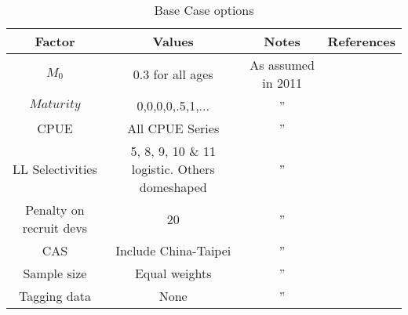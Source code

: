 \documentclass[a4paper,10pt]{article}
\begin{document}
\begin{table}
\begin{center}
\label{tab:datasumm}
\begin{tabular}{|cccc|}
\hline
{\tiny Factor} & {\tiny Values} & {\tiny Notes} & {\tiny References} \\
\hline\hline
{\tiny $M_0$} 			& {\tiny 0.3 for all ages}     					& {\tiny As assumed in 2011} 	& {\tiny }\\
{\tiny $Maturity$} 		& {\tiny 0,0,0,0,.5,1,...}     					& {\tiny ''}			& {\tiny }\\
{\tiny CPUE} 			& {\tiny All CPUE Series}      					& {\tiny ''}			& {\tiny }\\
{\tiny LL Selectivities}	& {\tiny 5, 8, 9, 10 \& 11 logistic. Others domeshaped}	& {\tiny ''}			& {\tiny }\\
{\tiny Penalty on recruit devs}	& {\tiny 20 }               					& {\tiny ''}			& {\tiny }\\
{\tiny CAS} 			& {\tiny Include China-Taipei} 					& {\tiny ''}			& {\tiny }\\
{\tiny Sample size} 		& {\tiny Equal weights}        					& {\tiny ''}			& {\tiny }\\
{\tiny Tagging data} 		& {\tiny None}                 					& {\tiny ''}			& {\tiny }\\
\hline
\end{tabular}
\end{center}
\caption{Base Case options}
\label{tab:bc}
\end{table}
\end{document}
